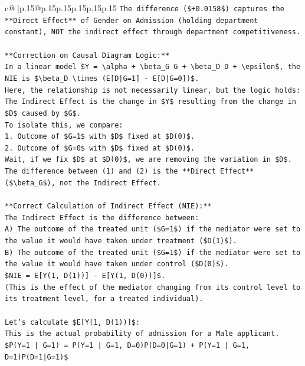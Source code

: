 \documentclass{article}
\begin{document}
{\begin{supertabular}{c@{$\;$}|p{.15\linewidth}@{}p{.15\linewidth}p{.15\linewidth}p{.15\linewidth}p{.15\linewidth}p{.15\linewidth}}
{{{\texttt{The difference (\$+0.0158\$) captures the **Direct Effect** of Gender on Admission (holding department constant), NOT the indirect effect through department competitiveness.} \\
\\ 
\texttt{**Correction on Causal Diagram Logic:**} \\
\texttt{In a linear model \$Y = \textbackslash{}alpha + \textbackslash{}beta\_G G + \textbackslash{}beta\_D D + \textbackslash{}epsilon\$, the NIE is \$\textbackslash{}beta\_D \textbackslash{}times (E{[}D|G=1{]} {-} E{[}D|G=0{]})\$.} \\
\texttt{Here, the relationship is not necessarily linear, but the logic holds:} \\
\texttt{The Indirect Effect is the change in \$Y\$ resulting from the change in \$D\$ caused by \$G\$.} \\
\texttt{To isolate this, we compare:} \\
\texttt{1.  Outcome of \$G=1\$ with \$D\$ fixed at \$D(0)\$.} \\
\texttt{2.  Outcome of \$G=0\$ with \$D\$ fixed at \$D(0)\$.} \\
\texttt{Wait, if we fix \$D\$ at \$D(0)\$, we are removing the variation in \$D\$. The difference between (1) and (2) is the **Direct Effect** (\$\textbackslash{}beta\_G\$), not the Indirect Effect.} \\
\\ 
\texttt{**Correct Calculation of Indirect Effect (NIE):**} \\
\texttt{The Indirect Effect is the difference between:} \\
\texttt{A) The outcome of the treated unit (\$G=1\$) if the mediator were set to the value it would have taken under treatment (\$D(1)\$).} \\
\texttt{B) The outcome of the treated unit (\$G=1\$) if the mediator were set to the value it would have taken under control (\$D(0)\$).} \\
\texttt{\$NIE = E{[}Y(1, D(1)){]} {-} E{[}Y(1, D(0)){]}\$.} \\
\texttt{(This is the effect of the mediator changing from its control level to its treatment level, for a treated individual).} \\
\\ 
\texttt{Let's calculate \$E{[}Y(1, D(1)){]}\$:} \\
\texttt{This is the actual probability of admission for a Male applicant.} \\
\texttt{\$P(Y=1 | G=1) = P(Y=1 | G=1, D=0)P(D=0|G=1) + P(Y=1 | G=1, D=1)P(D=1|G=1)\$} \\
}}}
\end{supertabular}}
\end{document}
